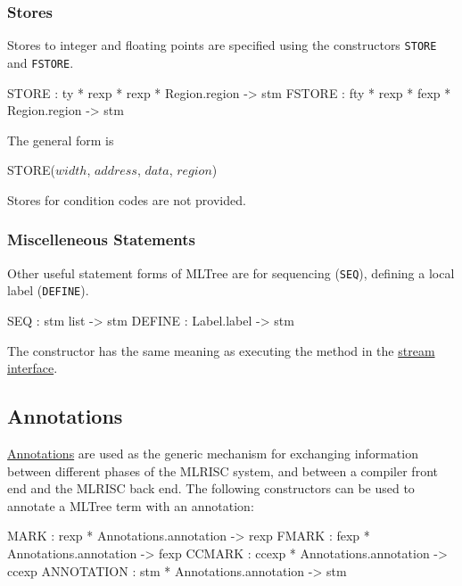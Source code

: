 \subsubsection{Stores}
Stores to integer and floating points are specified using the
constructors \verb|STORE| and \verb|FSTORE|.   
\begin{SML}
   STORE  : ty * rexp * rexp * Region.region -> stm
   FSTORE : fty * rexp * fexp * Region.region -> stm
\end{SML}

The general form is
\begin{SML}
   STORE(\(width\), \(address\), \(data\), \(region\))
\end{SML}

Stores for condition codes are not provided.
\subsubsection{Miscelleneous Statements}

Other useful statement forms of MLTree are for sequencing (\verb|SEQ|),
defining a local label (\verb|DEFINE|).
\begin{SML}
   SEQ    : stm list -> stm
   DEFINE : Label.label -> stm
\end{SML}
The constructor  has the same meaning as 
executing the method  in the 
\href{stream.html}{stream interface}.

\subsection{Annotations}
\href{annotations.html}{Annotations} are used as the generic mechanism for
exchanging information between different phases of the MLRISC system, and
between a compiler front end and the MLRISC back end.
The following constructors can be used to annotate a MLTree term with
an annotation:
\begin{SML}
   MARK : rexp * Annotations.annotation -> rexp
   FMARK : fexp * Annotations.annotation -> fexp
   CCMARK : ccexp * Annotations.annotation -> ccexp 
   ANNOTATION : stm * Annotations.annotation -> stm
\end{SML}
